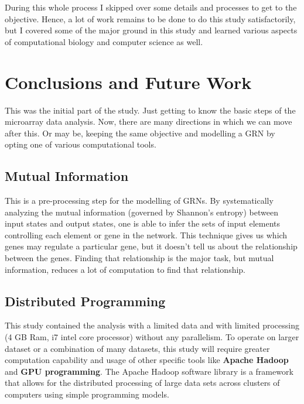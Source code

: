 \documentclass[oneside, a4paper, 11pt]{book}
\begin{document}
During this whole process I skipped over some details and processes to get to the objective. Hence, a lot of work remains to be done to do this study satisfactorily, but I covered some of the major ground in this study and learned various aspects of computational biology and computer science as well.


\chapter{Conclusions and Future Work}
\markboth{}{}
This was the initial part of the study. Just getting to know the basic steps of the microarray data analysis. Now, there are many directions in which we can move after this. Or may be, keeping the same objective and modelling a GRN by opting one of various computational tools.

\section{Mutual Information}
This is a pre-processing step for the modelling of GRNs. By systematically analyzing the mutual information (governed by Shannon's entropy) between input states and output states, one is able to infer the sets of input elements controlling each element or gene in the network\cite{liang, wang, adam}. This technique gives us which genes may regulate a particular gene, but it doesn't tell us about the relationship between the genes. Finding that relationship is the major task, but mutual information, reduces a lot of computation to find that relationship.
\newline

\section{Distributed Programming}
This study contained the analysis with a limited data and with limited processing (4 GB Ram, i7 intel core processor) without any parallelism. To operate on larger dataset or a combination of many datasets, this study will require greater computation capability and usage of other specific tools like \textbf{Apache Hadoop} and \textbf{GPU programming}. The Apache Hadoop software library is a framework that allows for the distributed processing of large data sets across clusters of computers using simple programming models.
\newline
\end{document}
